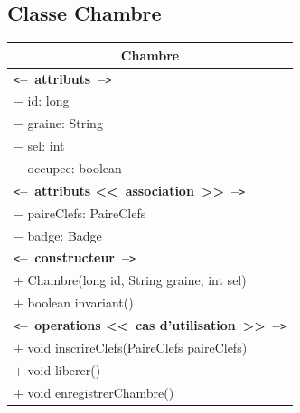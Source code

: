 \documentclass[11pt,article]{article}
\newcommand{\cmt}[1]{\texttt{<}\textbf{--~#1~--}\texttt{>}}
\begin{document}
  \subsection{Classe \textsf{Chambre}}
  \begin{center}
	  \begin{longtable}{|p{15cm}|}
		  \hline
		  \multicolumn{1}{|c|}{{\Large \textsf{Chambre}}} \\
		  \hline
		  \cmt{attributs}\\
		  $-$ id: long \\
		  $-$ graine: String \\
		  $-$ sel: int \\
		  $-$ occupee: boolean \\
		  \cmt{attributs <<~association~>>}\\
		  $-$ paireClefs: PaireClefs \\
		  $-$ badge: Badge \\
		  \hline
		  \cmt{constructeur} \\
		  $+$ Chambre(long id, String graine, int sel) \\
		  $+$ boolean invariant() \\
		  \cmt{operations <<~cas d'utilisation~>>} \\
		  $+$ void inscrireClefs(PaireClefs paireClefs) \\
		  $+$ void liberer() \\
		  $+$ void enregistrerChambre() \\
		  \hline
	  \end{longtable}
  \end{center}
\end{document}
